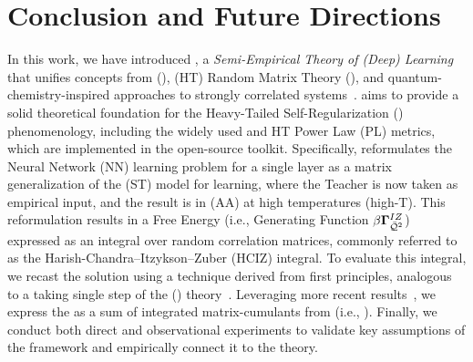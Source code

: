 \section{Conclusion and Future Directions}
\label{sxn:conclusions}

In this work, we have introduced \SETOL, a \emph{Semi-Empirical Theory of (Deep) Learning}
that unifies concepts from \StatisticalMechanics (\STATMECH), \HeavyTailed (HT) Random Matrix Theory (\RMT), and quantum-chemistry-inspired approaches to strongly correlated systems~\cite{Martin1996,Martin1996_CPL,Martin1998}. \SETOL aims to provide a solid theoretical foundation for the Heavy-Tailed Self-Regularization (\HTSR) phenomenology, including the widely used \ALPHA and \ALPHAHAT HT Power Law (PL) \LayerQuality metrics, which are implemented in the open-source \WW toolkit. Specifically, \SETOL reformulates the Neural Network (NN) learning problem for a single layer as a matrix generalization of the \StudentTeacher (ST) model for \Perceptron learning, where the Teacher is now taken as 
empirical input, and the result is in \AnnealedApproximation (AA) at high temperatures (high-T).
This reformulation results in a Free Energy (i.e., Generating Function $\beta\mathbf{\Gamma}^{IZ}_{\bar{\mathcal{Q}}^{2}}$)  expressed as an integral over random \Student correlation matrices, commonly referred to as the Harish-Chandra–Itzykson–Zuber (HCIZ) integral. To evaluate this integral, we recast the solution using a technique derived from first principles, analogous to a taking single step of the \WilsonExactRenormalizationGroup (\ERG) theory~\cite{NobelPrizeRG,PhysRevLett.69.800}.
Leveraging more recent results~\cite{Tanaka2007,Tanaka2008}, we express the \LayerQuality as a sum of integrated matrix-cumulants from \RMT (i.e., \RTransforms). Finally, we conduct both direct and observational experiments to validate key assumptions of the \SETOL framework and empirically connect it to the \HTSR theory.


